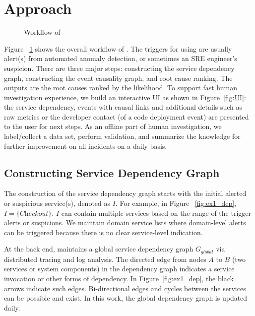 \section{Approach}
\begin{figure}[t]
\centering
{}
  \caption{Workflow of \system}
  \label{fig:workflow}
\end{figure}

Figure ~\ref{fig:workflow} shows the overall workflow of \system. The triggers for using \system are usually alert(s) from automated anomaly detection, or sometimes an SRE engineer's suspicion. There are three major steps: constructing the service  dependency graph, constructing the event causality graph,  and root cause ranking. The outputs are the root causes ranked by the likelihood. To support fast human investigation experience, we build an interactive UI as shown in  Figure~\ref{fig:UI}: the service dependency, events with causal links and additional details such as raw metrics or the developer contact (of a code deployment event) are presented to the user for next steps. As an  offline part of human investigation, we label/collect a data set, perform validation, and summarize the knowledge for further improvement on all incidents on a daily basis. %

\subsection{Constructing Service Dependency Graph}
\label{sec:appgraph}

The construction of the service dependency graph starts with the initial alerted or suspicious service(s), denoted as $I$. For example, in Figure ~\ref{fig:ex1_dep}, $I=\{\textit{Checkout}\}$. $I$ can contain multiple services based on the range of the trigger alerts or suspicions. We maintain domain service lists where domain-level alerts can be triggered because there is no clear service-level indication.

At the back end, \system maintains a global service dependency graph $G_{global}$ via distributed tracing and log analysis. The directed edge from nodes $A$ to $B$ (two services or system components) in the dependency graph indicates a service invocation or other forms of dependency. In Figure~\ref{fig:ex1_dep}, the black arrows indicate such edges. Bi-directional edges and cycles between the services can be possible and exist. In this work, the global dependency graph is updated daily.%

